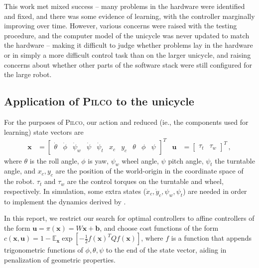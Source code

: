 \documentclass[main.tex]{subfiles}
\begin{document}
	This work met mixed success -- many problems in the hardware were identified and fixed, and there was some evidence of learning, with the controller marginally improving over time.
	However, various concerns were raised with the testing procedure, and the computer model of the unicycle was never updated to match the hardware -- making it difficult to judge whether problems lay in the hardware or in simply a more difficult control task than on the larger unicycle, and raising concerns about whether other parts of the software stack were still configured for the large robot.

	\subsection{Application of \textsc{Pilco} to the unicycle}
		For the purposes of \textsc{Pilco}, our action and reduced (ie., the components used for learning) state vectors are
		\begin{align}
			\bm{x} &= \begin{bmatrix}
				\dot\theta & \dot\phi &\dot\psi_w & \dot\psi & \dot\psi_t &
				x_c & y_c &
				\theta &
				\phi & \psi
			\end{bmatrix}^T &
			\bm{u} &= \begin{bmatrix}
				\tau_t & \tau_w
			\end{bmatrix}^T\,, \label{eq:state-vars}
		\end{align}
		where $\theta$ is the roll angle, $\phi$ is yaw, $\psi_w$ wheel angle,
		$\psi$ pitch angle, $\psi_t$ the turntable angle, and $x_c, y_c$ are the position of the world-origin in the coordinate space of the robot.
		$\tau_t$ and $\tau_w$ are the control torques on the turntable and wheel, respectively.
		In simulation, some extra states ($\dot{x}_c, \dot{y}_c, \psi_w, \psi_t$) are needed in order to implement the dynamics derived by \citeauthor{forster} \cite{forster}.

		In this report, we restrict our search for optimal controllers to affine controllers of the form
		$\bm{u} = \pi(\bm{x}) = W\bm{x} + \bm{b}$, and choose cost functions of the form
		$c(\bm{x}, \bm{u}) = 1 - \mathbb{E}_{\bm{x}} \exp\left[-\frac{1}{2} f(\bm{x})^T Q f(\bm{x})\right]$, where $f$ is a function that appends trigonometric functions of $\phi, \theta, \psi$ to the end of the state vector, aiding in penalization of geometric properties.
\end{document}
